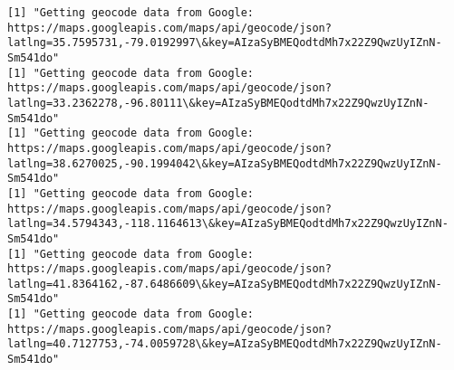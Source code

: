 \documentclass[11pt]{article}
\begin{document}
\begin{Verbatim}[commandchars=\\\{\}]
[1] "Getting geocode data from Google: https://maps.googleapis.com/maps/api/geocode/json?latlng=35.7595731,-79.0192997\&key=AIzaSyBMEQodtdMh7x22Z9QwzUyIZnN-Sm541do"
[1] "Getting geocode data from Google: https://maps.googleapis.com/maps/api/geocode/json?latlng=33.2362278,-96.80111\&key=AIzaSyBMEQodtdMh7x22Z9QwzUyIZnN-Sm541do"
[1] "Getting geocode data from Google: https://maps.googleapis.com/maps/api/geocode/json?latlng=38.6270025,-90.1994042\&key=AIzaSyBMEQodtdMh7x22Z9QwzUyIZnN-Sm541do"
[1] "Getting geocode data from Google: https://maps.googleapis.com/maps/api/geocode/json?latlng=34.5794343,-118.1164613\&key=AIzaSyBMEQodtdMh7x22Z9QwzUyIZnN-Sm541do"
[1] "Getting geocode data from Google: https://maps.googleapis.com/maps/api/geocode/json?latlng=41.8364162,-87.6486609\&key=AIzaSyBMEQodtdMh7x22Z9QwzUyIZnN-Sm541do"
[1] "Getting geocode data from Google: https://maps.googleapis.com/maps/api/geocode/json?latlng=40.7127753,-74.0059728\&key=AIzaSyBMEQodtdMh7x22Z9QwzUyIZnN-Sm541do"

    \end{Verbatim}
\end{document}
